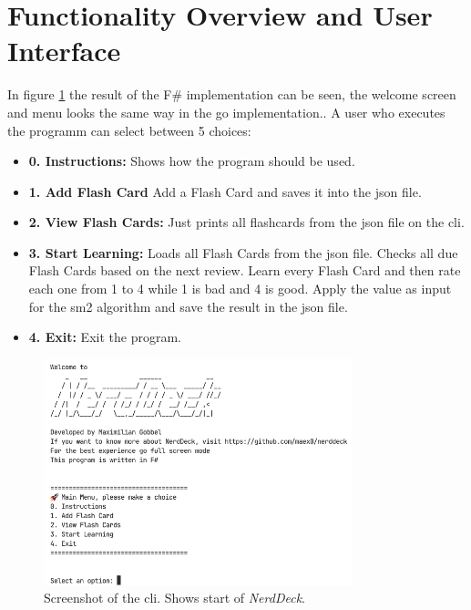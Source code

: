    \section{Functionality Overview and User Interface}
    In figure \ref{fig:screenshotcli} the result of the F\# implementation can be seen, the welcome screen and menu looks the same way in the go implementation.. A user who executes the programm can select between 5 choices:        
    \begin{itemize}
        \item \textbf{0. Instructions:} Shows how the program should be used.
        \item \textbf{1. Add Flash Card} Add a Flash Card and saves it into the \ac{json} file.
        \item \textbf{2. View Flash Cards:} Just prints all flashcards from the \ac{json} file on the \ac{cli}.
        \item \textbf{3. Start Learning:} Loads all Flash Cards from the \ac{json} file. Checks all due Flash Cards based on the next review. Learn every Flash Card and then rate each one from 1 to 4 while 1 is bad and 4 is good. Apply the value as input for the \ac{sm2} algorithm and save the result in the \ac{json} file.
        \item \textbf{4. Exit:} Exit the program.
    \end{itemize}

    \begin{figure}
        \centering
        \includegraphics[width=0.8\textwidth]{ScreenshotNerdDeck.png}
        \caption{Screenshot of the \ac{cli}. Shows start of \textit{NerdDeck}.}
        \label{fig:screenshotcli}
    \end{figure}


